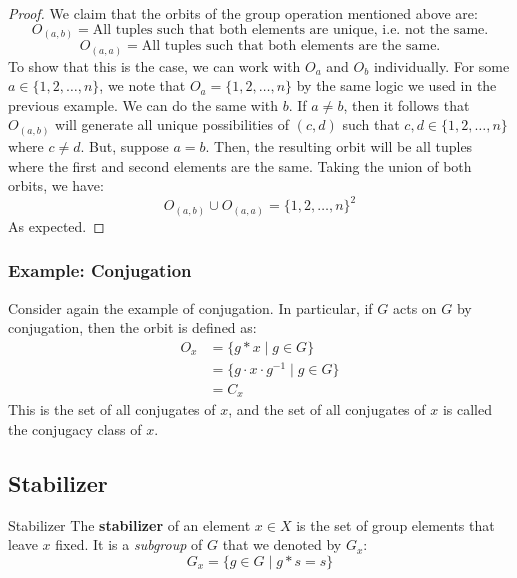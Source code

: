 \documentclass[letterpaper]{article}
\begin{document}
\begin{mdframed}
    \begin{proof}
        We claim that the orbits of the group operation mentioned above are: 
        \[O_{(a, b)} = \text{All tuples such that both elements are unique, i.e. not the same.}\]
        \[O_{(a, a)} = \text{All tuples such that both elements are the same.}\]
        To show that this is the case, we can work with $O_a$ and $O_b$ individually. For some $a \in \{1, 2, \dots, n\}$, we note that $O_a = \{1, 2, \dots, n\}$ by the same logic we used in the previous example. We can do the same with $b$. If $a \neq b$, then it follows that $O_{(a, b)}$ will generate all unique possibilities of $(c, d)$ such that $c, d \in \{1, 2, \dots, n\}$ where $c \neq d$. But, suppose $a = b$. Then, the resulting orbit will be all tuples where the first and second elements are the same. Taking the union of both orbits, we have: 
        \[O_{(a, b)} \cup O_{(a, a)} = \{1, 2, \dots, n\}^2\]
        As expected. 
    \end{proof}
\end{mdframed}

\subsubsection{Example: Conjugation}
Consider again the example of conjugation. In particular, if $G$ acts on $G$ by conjugation, then the orbit is defined as: 
\begin{equation*}
    \begin{aligned}
        O_{x} &= \{g * x \mid g \in G\} \\
            &= \{g \cdot x \cdot g^{-1} \mid g \in G\} \\ 
            &= C_x
    \end{aligned}
\end{equation*}
This is the set of all conjugates of $x$, and the set of all conjugates of $x$ is called the conjugacy class of $x$.

\subsection{Stabilizer}
\begin{definition}{Stabilizer}{}
    The \textbf{stabilizer} of an element $x \in X$ is the set of group elements that leave $x$ fixed. It is a \emph{subgroup} of $G$ that we denoted by $G_x$:
    \[G_x = \{g \in G \mid g * s = s\}\] 
\end{definition}
\end{document}
